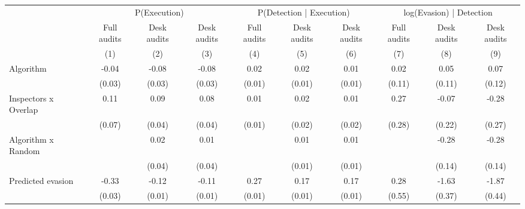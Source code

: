 \begin{tabular}{lccc|ccc|ccc} \toprule
\multicolumn{1}{l}{} & \multicolumn{3}{c}{P(Execution)} & \multicolumn{3}{c}{P(Detection | Execution)} & \multicolumn{3}{c}{log(Evasion) | Detection} \\\cmidrule(lr){2-4}\cmidrule(lr){5-7}\cmidrule(lr){8-10} \multicolumn{1}{l}{} & Full audits & Desk audits & Desk audits & Full audits & Desk audits & Desk audits & Full audits & Desk audits & Desk audits \\ \multicolumn{1}{l}{} & (1) & (2) & (3) & (4) & (5) & (6) & (7) & (8) & (9) \\ \midrule
Algorithm   &       -0.04         &       -0.08\sym{***}&       -0.08\sym{***}&        0.02\sym{**} &        0.02         &        0.01         &        0.02         &        0.05         &        0.07         \\
            &      (0.03)         &      (0.03)         &      (0.03)         &      (0.01)         &      (0.01)         &      (0.01)         &      (0.11)         &      (0.11)         &      (0.12)         \\
\addlinespace
Inspectors x Overlap&        0.11\sym{*}  &        0.09\sym{**} &        0.08\sym{**} &        0.01         &        0.02         &        0.01         &        0.27         &       -0.07         &       -0.28         \\
            &      (0.07)         &      (0.04)         &      (0.04)         &      (0.01)         &      (0.02)         &      (0.02)         &      (0.28)         &      (0.22)         &      (0.27)         \\
\addlinespace
Algorithm x Random&                     &        0.02         &        0.01         &                     &        0.01         &        0.01         &                     &       -0.28\sym{**} &       -0.28\sym{**} \\
            &                     &      (0.04)         &      (0.04)         &                     &      (0.01)         &      (0.01)         &                     &      (0.14)         &      (0.14)         \\
\addlinespace
Predicted evasion&       -0.33\sym{***}&       -0.12\sym{***}&       -0.11\sym{***}&        0.27\sym{***}&        0.17\sym{***}&        0.17\sym{***}&        0.28         &       -1.63\sym{***}&       -1.87\sym{***}\\
            &      (0.03)         &      (0.01)         &      (0.01)         &      (0.01)         &      (0.01)         &      (0.01)         &      (0.55)         &      (0.37)         &      (0.44)         \\

\end{tabular}
